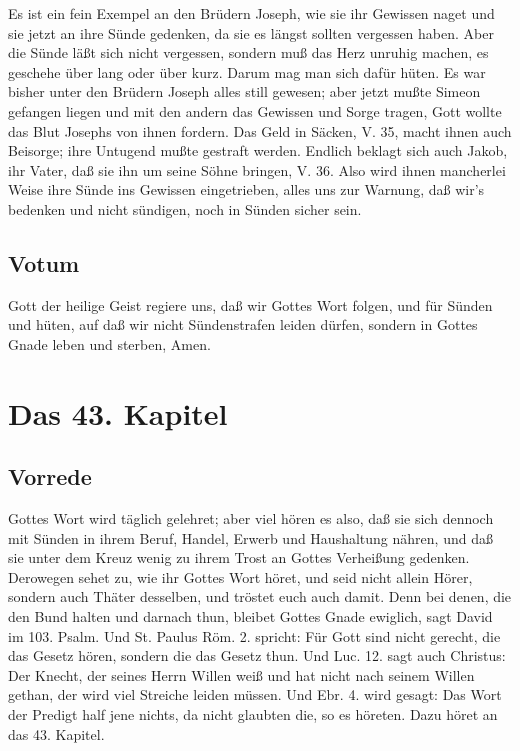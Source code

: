 Es ist ein fein Exempel an den Brüdern Joseph, wie sie ihr Gewissen naget und sie jetzt an ihre Sünde gedenken, da sie es längst sollten vergessen haben. Aber die Sünde läßt sich nicht vergessen, sondern muß das Herz unruhig machen, es geschehe über lang oder über kurz. Darum mag man sich dafür hüten. Es war bisher unter den Brüdern Joseph alles still gewesen; aber jetzt mußte Simeon gefangen liegen und mit den andern das Gewissen und Sorge tragen, Gott wollte das Blut Josephs von ihnen fordern. Das Geld in Säcken, V. 35, macht ihnen auch Beisorge; ihre Untugend mußte gestraft werden. Endlich beklagt sich auch Jakob, ihr Vater, daß sie ihn um seine Söhne bringen, V. 36. Also wird ihnen mancherlei Weise ihre Sünde ins Gewissen eingetrieben, alles uns zur Warnung, daß wir’s bedenken und nicht sündigen, noch in Sünden sicher sein.

\section{Votum}

Gott der heilige Geist regiere uns, daß wir Gottes Wort folgen, und für Sünden und hüten, auf daß wir nicht Sündenstrafen leiden dürfen, sondern in Gottes Gnade leben und sterben, Amen.

\chapter{Das 43. Kapitel}

\section{Vorrede}

Gottes Wort wird täglich gelehret; aber viel hören es also, daß sie sich dennoch mit Sünden in ihrem Beruf, Handel, Erwerb und Haushaltung nähren, und daß sie unter dem Kreuz wenig zu ihrem Trost an Gottes Verheißung gedenken. Derowegen sehet zu, wie ihr Gottes Wort höret, und seid nicht allein Hörer, sondern auch Thäter desselben, und tröstet euch auch damit. Denn bei denen, die den Bund halten und darnach thun, bleibet Gottes Gnade ewiglich, sagt David im 103. Psalm. Und St. Paulus Röm. 2. spricht: Für Gott sind nicht gerecht, die das Gesetz hören, sondern die das Gesetz thun. Und Luc. 12. sagt auch Christus: Der Knecht, der seines Herrn Willen weiß und hat nicht nach seinem Willen gethan, der wird viel Streiche leiden müssen. Und Ebr. 4. wird gesagt: Das Wort der Predigt half jene nichts, da nicht glaubten die, so es höreten. Dazu höret an das 43. Kapitel.

